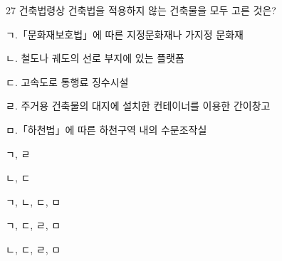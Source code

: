 \begin{question}{27}
건축법령상 건축법을 적용하지 않는 건축물을 모두 고른 것은?
\begin{framedtext}
ㄱ.「문화재보호법」에 따른 지정문화재나 가지정 문화재 \par
ㄴ. 철도나 궤도의 선로 부지에 있는 플랫폼 \par
ㄷ. 고속도로 통행료 징수시설 \par
ㄹ. 주거용 건축물의 대지에 설치한 컨테이너를 이용한 간이창고 \par
ㅁ.「하천법」에 따른 하천구역 내의 수문조작실 \par
\end{framedtext}
\begin{choices}
  \item ㄱ, ㄹ
  \item ㄴ, ㄷ
  \item ㄱ, ㄴ, ㄷ, ㅁ
  \item ㄱ, ㄷ, ㄹ, ㅁ
  \item ㄴ, ㄷ, ㄹ, ㅁ
\end{choices}
\end{question}
